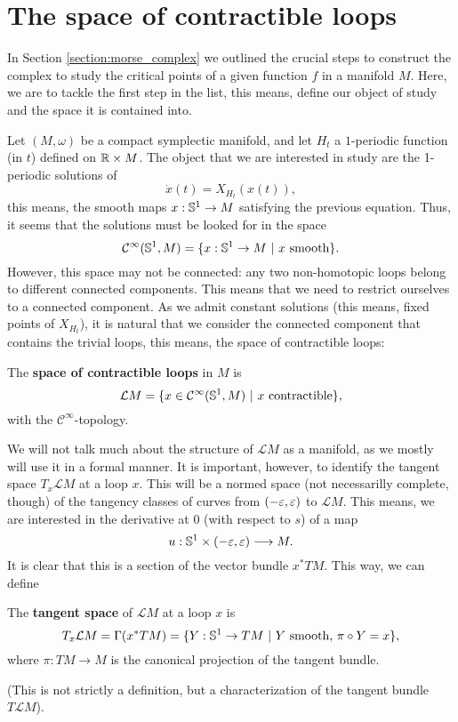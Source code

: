 \section{The space of contractible loops} \label{section:floerq_loops}

In Section \ref{section:morse_complex} we outlined the crucial steps to construct the complex to study the critical points of a given function $f$ in a manifold $M$. Here, we are to tackle the first step in the list, this means, define our object of study and the space it is contained into.

Let $(M,\omega)$ be a compact symplectic manifold, and let $H_t$ a $1$-periodic function (in $t$) defined on $\mathbb{R} \times M$. The object that we are interested in study are the 1-periodic solutions of
$$\dot{x}(t) = X_{H_t}(x(t)) ,$$
this means, the smooth maps $x : \mathbb{S}^1 \rightarrow M$ satisfying the previous equation. Thus, it seems that the solutions must be looked for in the space
$$\mathcal{C}^{\infty}(\mathbb{S}^1,M) = \{ x : \mathbb{S}^1 \rightarrow M \ | \ x \text{ smooth} \} .$$
However, this space may not be connected: any two non-homotopic loops belong to different connected components. This means that we need to restrict ourselves to a connected component. As we admit constant solutions (this means, fixed points of $X_{H_t}$), it is natural that we consider the connected component that contains the trivial loops, this means, the space of contractible loops:

\begin{deff}
The {\bf space of contractible loops} in $M$ is
$$\mathcal{L}M = \{ x \in \mathcal{C}^{\infty}(\mathbb{S}^1,M) \ | \ x \text{ contractible} \} ,$$
with the $\mathcal{C}^{\infty}$-topology.
\end{deff}

We will not talk much about the structure of $\mathcal{L}M$ as a manifold, as we mostly will use it in a formal manner. It is important, however, to identify the tangent space $T_x\mathcal{L}M$ at a loop $x$. This will be a normed space (not necessarilly complete, though) of the tangency classes of curves from $(-\varepsilon,\varepsilon)$ to $\mathcal{L}M$. This means, we are interested in the derivative at $0$ (with respect to $s$) of a map
$$u : \mathbb{S}^1 \times (-\varepsilon,\varepsilon) \longrightarrow M .$$
It is clear that this is a section of the vector bundle $x^{\ast}TM$. This way, we can define

\begin{deff}
The {\bf tangent space} of $\mathcal{L}M$ at a loop $x$ is
$$T_x\mathcal{L}M = \Gamma(x^{\ast}TM) = \{ Y : \mathbb{S}^1 \rightarrow TM \ | \ Y \text{ smooth, } \pi \circ Y = x\},$$
where $\pi : TM \rightarrow M$ is the canonical projection of the tangent bundle.
\end{deff}

(This is not strictly a definition, but a characterization of the tangent bundle $T\mathcal{L}M$).
